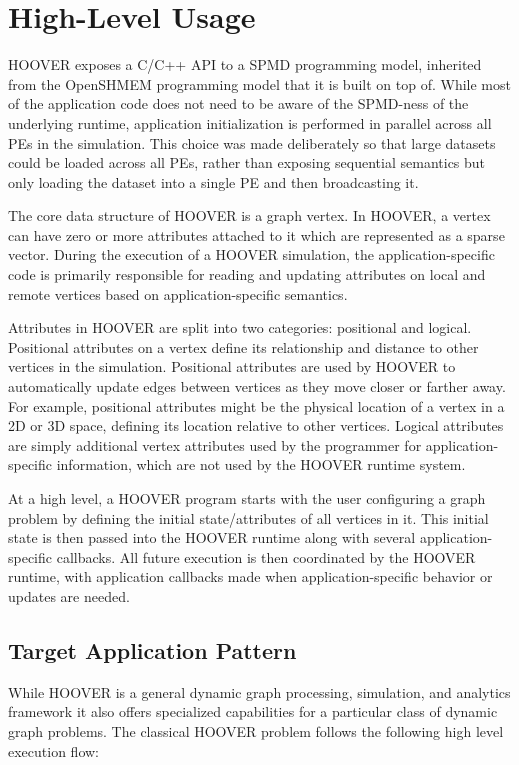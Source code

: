 \section{High-Level Usage}

HOOVER exposes a C/C++ API  to a SPMD programming model, inherited from the
OpenSHMEM programming model that it is built on top of. While most of the
application code does not need to be aware of the SPMD-ness of the underlying
runtime, application initialization is performed in parallel across all PEs in the
simulation. This choice was made deliberately so that large datasets could be
loaded across all PEs, rather than exposing sequential semantics but only
loading the dataset into a single PE and then broadcasting it.

The core data structure of HOOVER is a graph vertex. In HOOVER, a vertex can
have zero or more attributes attached to it which are represented as a sparse
vector. During the execution of a HOOVER simulation, the application-specific
code is primarily responsible for reading and updating attributes
on local and remote vertices based on application-specific semantics.

Attributes in HOOVER are split into two categories: positional and logical.
Positional attributes on a vertex define its relationship and distance to other
vertices in the simulation. Positional attributes are used by HOOVER to
automatically update edges between vertices as they move closer or farther away.
For example, positional attributes might be the physical location of a
vertex in a 2D or 3D space, defining its location relative to other vertices.
Logical attributes are simply additional vertex attributes used by the
programmer for application-specific information, which are not used by the
HOOVER runtime system.

At a high level, a HOOVER program starts with the user configuring a graph
problem by defining the initial state/attributes of all vertices in it. This
initial state is then passed into the HOOVER runtime along with several
application-specific callbacks. All future execution is then coordinated by the
HOOVER runtime, with application callbacks made when application-specific
behavior or updates are needed.

\subsection{Target Application Pattern}

While HOOVER is a general dynamic graph processing, simulation, and analytics
framework it also offers specialized capabilities for a particular class of
dynamic graph problems. The classical HOOVER problem follows the following high
level execution flow:

